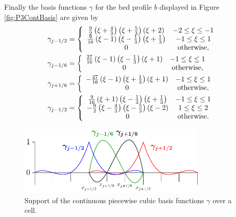 Finally the basis functions $\gamma$ for the bed profile $b$ displayed in Figure \ref{fig:P3ContBasis} are given by
\begin{subequations}
	\label{eqn:App1:GamDef}
\begin{align}
\gamma_{j-1/2} &= \left\lbrace \begin{array}{c c}
\frac{9}{2}\left(\xi + \frac{4}{3}\right)\left(\xi + \frac{5}{3}\right)\left(\xi + 2\right) & -2 \le \xi \le -1\\
\frac{9}{16}\left(\xi - 1\right)\left(\xi - \frac{1}{3}\right)\left(\xi  + \frac{1}{3}\right) & -1 \le \xi \le 1\\
0 & \text{otherwise}, 
\end{array} \right. \\
\gamma_{j-1/6} &= \left\lbrace \begin{array}{c c}
\frac{27}{16}\left(\xi - 1\right)\left(\xi - \frac{1}{3}\right)\left(\xi + 1\right) & -1 \le \xi \le 1\\
0 & \text{otherwise}, 
\end{array} \right. \\
\gamma_{j+1/6} &= \left\lbrace \begin{array}{c c}
-\frac{27}{16}\left(\xi - 1\right)\left(\xi + \frac{1}{3}\right)\left(\xi + 1\right) & -1 \le \xi \le 1\\
0 & \text{otherwise} ,
\end{array} \right. \\
\gamma_{j-1/2} &= \left\lbrace \begin{array}{c c}
\frac{9}{16}\left(\xi + 1\right)\left(\xi - \frac{1}{3}\right)\left(\xi  + \frac{1}{3}\right) & -1 \le \xi \le 1\\
-\frac{9}{2}\left(\xi - \frac{4}{3}\right)\left(\xi - \frac{5}{3}\right)\left(\xi - 2\right) & 1 \le \xi \le 2\\
0 & \text{otherwise} .
\end{array} \right. 
\end{align}
\end{subequations}

\begin{figure}
	\centering
	\includegraphics[width=0.8\textwidth]{./chp3/figures/P3.pdf}
	\caption{Support of the continuous piecewise cubic basis functions $\gamma$ over a cell.}
	\label{fig:P3ContBasisAPP}
\end{figure}


